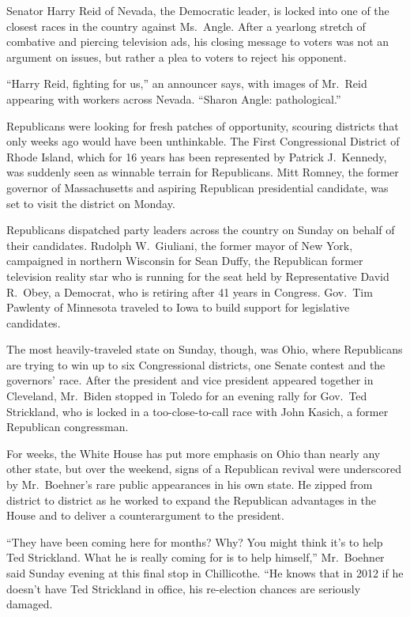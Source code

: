 ﻿\documentclass[12pt]{article}
\begin{document}
Senator Harry Reid of Nevada, the Democratic leader, is locked into one of the closest races in the
country against Ms.~Angle. After a yearlong stretch of combative and piercing television ads, his
closing message to voters was not an argument on issues, but rather a plea to voters to reject his
opponent.

``Harry Reid, fighting for us,'' an announcer says, with images of Mr.~Reid appearing with workers
across Nevada. ``Sharon Angle: pathological.''

Republicans were looking for fresh patches of opportunity, scouring districts that only weeks ago
would have been unthinkable. The First Congressional District of Rhode Island, which for 16 years
has been represented by Patrick J.~Kennedy, was suddenly seen as winnable terrain for Republicans.
Mitt Romney, the former governor of Massachusetts and aspiring Republican presidential candidate,
was set to visit the district on Monday.

Republicans dispatched party leaders across the country on Sunday on behalf of their candidates.
Rudolph W.~Giuliani, the former mayor of New York, campaigned in northern Wisconsin for Sean Duffy,
the Republican former television reality star who is running for the seat held by Representative
David R.~Obey, a Democrat, who is retiring after 41 years in Congress. Gov.~Tim Pawlenty of
Minnesota traveled to Iowa to build support for legislative candidates.

The most heavily-traveled state on Sunday, though, was Ohio, where Republicans are trying to win up
to six Congressional districts, one Senate contest and the governors' race. After the president and
vice president appeared together in Cleveland, Mr.~Biden stopped in Toledo for an evening rally for
Gov.~Ted Strickland, who is locked in a too-close-to-call race with John Kasich, a former Republican
congressman.

For weeks, the White House has put more emphasis on Ohio than nearly any other state, but over the
weekend, signs of a Republican revival were underscored by Mr.~Boehner's rare public appearances in
his own state. He zipped from district to district as he worked to expand the Republican advantages
in the House and to deliver a counterargument to the president.

``They have been coming here for months? Why? You might think it's to help Ted Strickland. What he
is really coming for is to help himself,'' Mr.~Boehner said Sunday evening at this final stop in
Chillicothe. ``He knows that in 2012 if he doesn't have Ted Strickland in office, his re-election
chances are seriously damaged.
\end{document}
